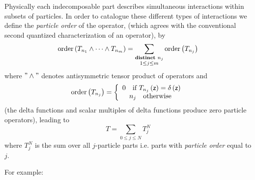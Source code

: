\documentclass[aps,preprint]{revtex4}%
\begin{document}
Physically each indecomposable part describes simultaneous interactions within
subsets of particles. In order to catalogue these different types of
interactions we define the \textit{particle order} of the operator, (which
agrees with the conventional second quantized characterization of an
operator), by
\begin{equation}
\operatorname{order}\left(  T_{n_{1}}\wedge\cdots\wedge T_{n_{m}}\right)
=\sum_{\substack{\text{\textbf{distinct }}n_{j}\\1\leq j\leq m}%
}\operatorname{order}\left(  T_{n_{j}}\right)
\end{equation}
where $"\wedge"$ denotes antisymmetric tensor product of operators
\cite{antiten} and
\begin{equation}
\operatorname{order}\left(  T_{n_{j}}\right)  =\left\{
\begin{array}
[c]{c}%
0\quad\text{if }T_{n_{j}}\left(  \mathsf{z}\right)  =\delta\left(
\mathsf{z}\right) \\
n_{j}\quad\text{otherwise }%
\end{array}
\right.
\end{equation}
(the delta functions and scalar multiples of delta functions produce zero
particle operators), leading to
\begin{equation}
T=%
{\displaystyle\sum\limits_{0\leq j\leq N}}
T_{j}^{N}%
\end{equation}
where $T_{j}^{N}$ is the sum over all $j$-particle parts i.e. parts with
\textit{particle order }equal to $j$.

For example:
\end{document}

